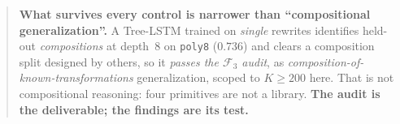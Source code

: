 \begin{abstract}
\textbf{What survives every control is narrower than ``compositional generalization''.} A Tree-LSTM trained on \emph{single} rewrites identifies held-out \emph{compositions} at depth~8 on \texttt{poly8} ($0.736$) and clears a composition split designed by others, so it \emph{passes the $\mathcal{F}_3$ audit}, as \emph{composition-of-known-transformations} generalization, scoped to $K{\geq}200$ here. That is not compositional reasoning: four primitives are not a library. \textbf{The audit is the deliverable; the findings are its test.}
\end{abstract}
